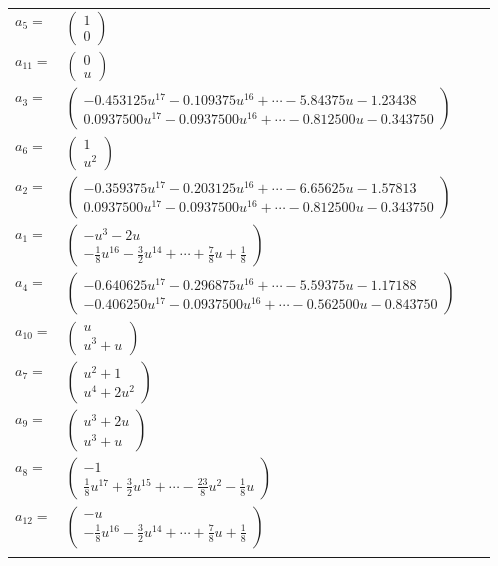 \documentclass[1p]{elsarticle_modified}
\theoremstyle{definition}
\begin{document}
\begin{tabular}{m{7pt} m{180pt} m{7pt} m{180pt} }
\flushright $a_{5}=$&$\begin{pmatrix}1\\0\end{pmatrix}$ \\
\flushright $a_{11}=$&$\begin{pmatrix}0\\u\end{pmatrix}$ \\
\flushright $a_{3}=$&$\begin{pmatrix}-0.453125 u^{17}-0.109375 u^{16}+\cdots-5.84375 u-1.23438\\0.0937500 u^{17}-0.0937500 u^{16}+\cdots-0.812500 u-0.343750\end{pmatrix}$ \\
\flushright $a_{6}=$&$\begin{pmatrix}1\\u^2\end{pmatrix}$ \\
\flushright $a_{2}=$&$\begin{pmatrix}-0.359375 u^{17}-0.203125 u^{16}+\cdots-6.65625 u-1.57813\\0.0937500 u^{17}-0.0937500 u^{16}+\cdots-0.812500 u-0.343750\end{pmatrix}$ \\
\flushright $a_{1}=$&$\begin{pmatrix}- u^3-2 u\\-\frac{1}{8} u^{16}-\frac{3}{2} u^{14}+\cdots+\frac{7}{8} u+\frac{1}{8}\end{pmatrix}$ \\
\flushright $a_{4}=$&$\begin{pmatrix}-0.640625 u^{17}-0.296875 u^{16}+\cdots-5.59375 u-1.17188\\-0.406250 u^{17}-0.0937500 u^{16}+\cdots-0.562500 u-0.843750\end{pmatrix}$ \\
\flushright $a_{10}=$&$\begin{pmatrix}u\\u^3+u\end{pmatrix}$ \\
\flushright $a_{7}=$&$\begin{pmatrix}u^2+1\\u^4+2 u^2\end{pmatrix}$ \\
\flushright $a_{9}=$&$\begin{pmatrix}u^3+2 u\\u^3+u\end{pmatrix}$ \\
\flushright $a_{8}=$&$\begin{pmatrix}-1\\\frac{1}{8} u^{17}+\frac{3}{2} u^{15}+\cdots-\frac{23}{8} u^2-\frac{1}{8} u\end{pmatrix}$ \\
\flushright $a_{12}=$&$\begin{pmatrix}- u\\-\frac{1}{8} u^{16}-\frac{3}{2} u^{14}+\cdots+\frac{7}{8} u+\frac{1}{8}\end{pmatrix}$\\&\end{tabular}
\end{document}
